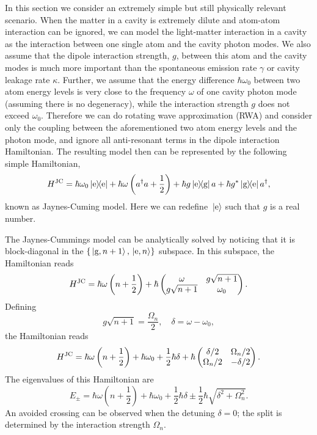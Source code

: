 \documentclass[hyperref, a4paper]{article}
\newcommand*{\kete}{\ket*{\text{e}}}
\newcommand*{\dyade}{\dyad{\text{e}}}
\newcommand*{\dyadeg}{\dyad{\text{e}}{\text{g}}}
\newcommand*{\dyadge}{\dyad{\text{g}}{\text{e}}}
\newcommand*{\statee}{\text{e}}
\newcommand*{\stateg}{\text{g}}
\begin{document}
In this section we consider an extremely simple but still physically relevant scenario. 
When the matter in a cavity is extremely dilute and
atom-atom interaction can be ignored,
we can model the light-matter interaction in a cavity
as the interaction between one single atom and the cavity photon modes.
We also assume that the dipole interaction strength, $g$, between this atom and the cavity modes
is much more important than 
the spontaneous emission rate $\gamma$ or cavity leakage rate $\kappa$.
Further, we assume that the energy difference $\hbar \omega_0$ between two atom energy levels
is very close to the frequency $\omega$ of one cavity photon mode (assuming there is no degeneracy),
while the interaction strength $g$ does not exceed $\omega_0$.
Therefore we can do rotating wave approximation (RWA)
and consider only the coupling between the aforementioned two atom energy levels and the photon mode,
and ignore all anti-resonant terms in the dipole interaction Hamiltonian.
The resulting model then can be represented by the following simple Hamiltonian,
\begin{equation}
    H^{\text{JC}} = \hbar \omega_0 \dyade + \hbar \omega \left( a^\dag a + \frac{1}{2} \right) + \hbar g \dyadeg a + \hbar g^* \dyadge a^\dag,
\end{equation}
known as Jaynes-Cuming model.
Here we can redefine $\kete$ such that $g$ is a real number.

The Jaynes-Cummings model can be analytically solved
by noticing that it is block-diagonal in the $\{\ket*{\stateg, n+1}, \ket*{\statee, n}\}$ subspace.
In this subspace, the Hamiltonian reads
\begin{equation}
    H^{\text{JC}} = \hbar \omega \left(n + \frac{1}{2}\right) + \hbar \pmqty{
        \omega & g \sqrt{n+1} \\
        g \sqrt{n+1} & \omega_0 
    }.
\end{equation}
Defining 
\begin{equation}
    g \sqrt{n+1} = \frac{\Omega_n}{2}, \quad \delta = \omega - \omega_0,
\end{equation}
the Hamiltonian reads 
\begin{equation}
    H^{\text{JC}} = \hbar \omega \left( n + \frac{1}{2} \right) + \hbar \omega_0 + \frac{1}{2} \hbar \delta + \hbar 
    \pmqty{
        \delta / 2 & \Omega_n / 2 \\
        \Omega_n / 2 & - \delta / 2
    }.
\end{equation}
The eigenvalues of this Hamiltonian are 
\begin{equation}
    E_\pm = \hbar \omega \left( n + \frac{1}{2} \right) + \hbar \omega_0 + \frac{1}{2} \hbar \delta 
    \pm \frac{1}{2} \hbar \sqrt{\delta^2 + \Omega_n^2}.
\end{equation}
An avoided crossing can be observed when the detuning $\delta=0$;
the split is determined by the interaction strength $\Omega_n$.
\end{document}
